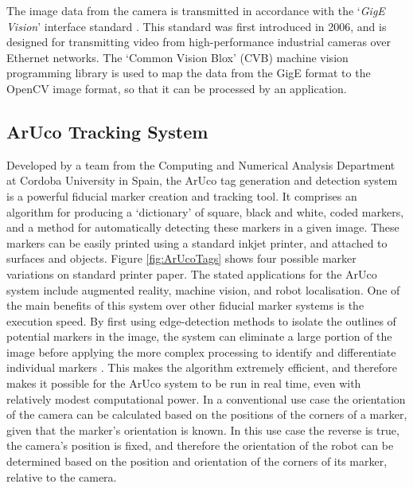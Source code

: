 The image data from the camera is transmitted in accordance with the `\textit{GigE Vision}' interface standard \cite{GigEVision}. This standard was first introduced in 2006, and is designed for transmitting video from high-performance industrial cameras over Ethernet networks. The `Common Vision Blox' (CVB) machine vision programming library is used to map the data from the GigE format to the OpenCV image format, so that it can be processed by an application.


\subsection{ArUco Tracking System} \label{ArUco}
Developed by a team from the Computing and Numerical Analysis Department at Cordoba University in Spain, the ArUco tag generation and detection system \cite{Garrido:2014} is a powerful fiducial marker creation and tracking tool. It comprises an algorithm for producing a `dictionary' of square, black and white, coded markers, and a method for automatically detecting these markers in a given image. These markers can be easily printed using a standard inkjet printer, and attached to surfaces and objects. Figure \ref{fig:ArUcoTags} shows four possible marker variations on standard printer paper. The stated applications for the ArUco system include augmented reality, machine vision, and robot localisation. One of the main benefits of this system over other fiducial marker systems is the execution speed. By first using edge-detection methods to isolate the outlines of potential markers in the image, the system can eliminate a large portion of the image before applying the more complex processing to identify and differentiate individual markers \cite{Garrido:2014}. This makes the algorithm extremely efficient, and therefore makes it possible for the ArUco system to be run in real time, even with relatively modest computational power. In a conventional use case the orientation of the camera can be calculated based on the positions of the corners of a marker, given that the marker's orientation is known. In this use case the reverse is true, the camera's position is fixed, and therefore the orientation of the robot can be determined based on the position and orientation of the corners of its marker, relative to the camera.

